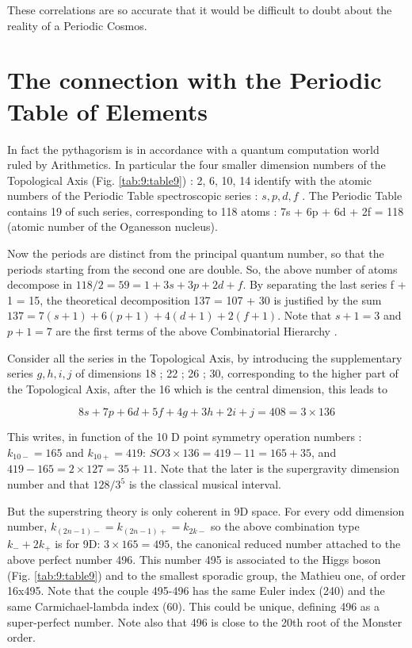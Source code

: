 \documentclass[a4paper,9pt]{article}
\begin{document}
These correlations are so accurate that it would be difficult to doubt about the reality of a Periodic Cosmos.





\section{The connection with the Periodic Table of Elements}

     In fact the pythagorism is in accordance with a quantum computation world ruled by Arithmetics. In particular the four smaller dimension numbers of the Topological Axis (Fig. \ref{tab:9:table9}) : 2, 6, 10, 14 identify with the atomic numbers of the Periodic Table spectroscopic series : $s, p, d, f$ . The Periodic Table contains 19 of such series, corresponding to 118 atoms : 7s + 6p + 6d + 2f = 118 (atomic number of the Oganesson nucleus). 
     

     Now the periods are distinct from the principal quantum number, so that the periods starting from the second one are double. So, the above number of atoms decompose in $118/2 = 59 = 1 + 3s + 3p + 2d + f$.  By separating the last series f + 1 = 15, the theoretical decomposition 137 = 107 + 30 is justified by the sum $137 = 7(s +1) + 6(p +1) + 4(d +1) + 2(f +1)$. Note that $s + 1 = 3$ and $p + 1 = 7$ are the first terms of the above Combinatorial Hierarchy\cite{Bastin} .



     Consider all the series in the Topological Axis, by introducing the supplementary series $g, h, i, j$ of dimensions 18 ; 22 ; 26 ; 30, corresponding to the higher part of the Topological Axis, after the 16 which is the central dimension, this leads to
     
     \begin{equation}
      8s + 7p + 6 d + 5f + 4g + 3h + 2i + j = 408 = 3 \times 136   
     \end{equation}
      
     
     This writes, in function of the 10 D point symmetry operation numbers :  $k_{10-} = 165$ and $k_{10+} = 419$: $SO3 \times 136 = 419 - 11 = 165 + 35$, and $419-165 = 2 \times 127 =  35 + 11$. Note that the later is the supergravity dimension number and that $128/3^5$ is the classical musical interval. 
     
     
     But the superstring theory is only coherent in 9D space. For every odd dimension number, $k_{(2n - 1)-} = k_{(2n - 1)+} = k_{2k-}$ so the above combination type $k_- + 2k_+$ is for 9D: $3 \times 165 = 495$, the canonical reduced number attached to the above perfect number 496. This number 495 is associated to the Higgs boson (Fig. \ref{tab:9:table9}) and to the smallest sporadic group, the Mathieu one, of order 16x495. Note that the couple 495-496 has the same Euler index (240) and the same Carmichael-lambda index (60). This could be unique, defining 496 as a super-perfect number. Note also that 496 is close to the 20th root of the Monster order.
 
\end{document}
